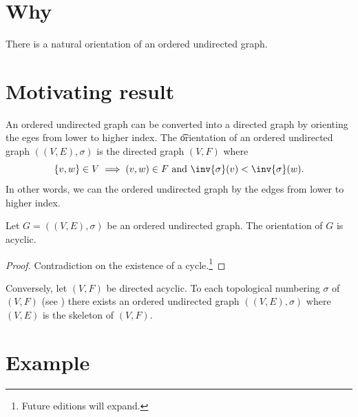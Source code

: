

\section*{Why}

There is a natural orientation of an ordered undirected graph.

\section*{Motivating result}

An ordered undirected graph can be converted into a directed graph by orienting the eges from lower to higher index.
The \t{orientation} of an ordered undirected graph $((V, E),\sigma )$ is the directed graph $(V, F)$ where
    \[
\set{v, w} \in V \implies (v, w) \in F \text{ and } \inv{\sigma }(v) < \inv{\sigma }(w).
    \]
In other words, we can  the ordered undirected graph by  the edges from lower to higher index.

\begin{proposition}
Let $G = ((V, E), \sigma )$ be an ordered undirected graph.
The orientation of $G$ is acyclic.
\begin{proof}Contradiction on the existence of a cycle.\footnote{Future editions will expand.}\end{proof}\end{proposition}
Conversely, let $(V, F)$ be directed acyclic.
To each topological numbering $\sigma $ of $(V, F)$ (see ) there exists an ordered undirected graph $((V, E), \sigma )$ where $(V, E)$ is the skeleton of $(V, F)$.

\section*{Example}

